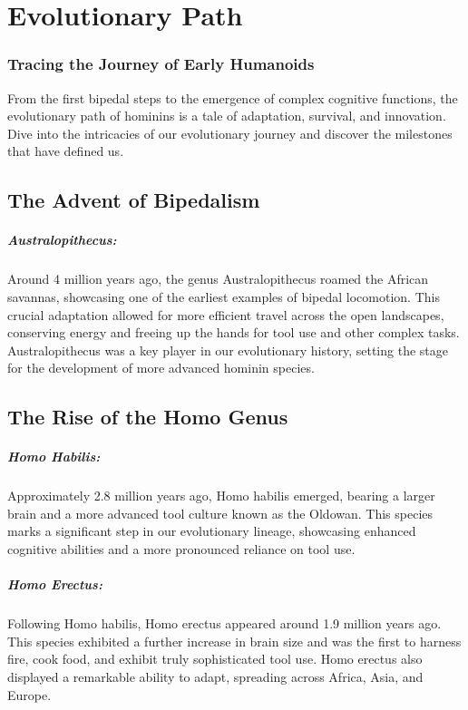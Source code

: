 \documentclass[a4paper,12pt]{book}
\begin{document}
\chapter{Evolutionary Path}
\subsection*{Tracing the Journey of Early Humanoids}

From the first bipedal steps to the emergence of complex cognitive functions, the evolutionary path of hominins is a tale of adaptation, survival, and innovation. Dive into the intricacies of our evolutionary journey and discover the milestones that have defined us.

\section*{The Advent of Bipedalism}

\paragraph{Australopithecus:}
Around 4 million years ago, the genus Australopithecus roamed the African savannas, showcasing one of the earliest examples of bipedal locomotion. This crucial adaptation allowed for more efficient travel across the open landscapes, conserving energy and freeing up the hands for tool use and other complex tasks. Australopithecus was a key player in our evolutionary history, setting the stage for the development of more advanced hominin species.

\section*{The Rise of the Homo Genus}

\paragraph{Homo Habilis:}
Approximately 2.8 million years ago, Homo habilis emerged, bearing a larger brain and a more advanced tool culture known as the Oldowan. This species marks a significant step in our evolutionary lineage, showcasing enhanced cognitive abilities and a more pronounced reliance on tool use.

\paragraph{Homo Erectus:}
Following Homo habilis, Homo erectus appeared around 1.9 million years ago. This species exhibited a further increase in brain size and was the first to harness fire, cook food, and exhibit truly sophisticated tool use. Homo erectus also displayed a remarkable ability to adapt, spreading across Africa, Asia, and Europe.
\end{document}
